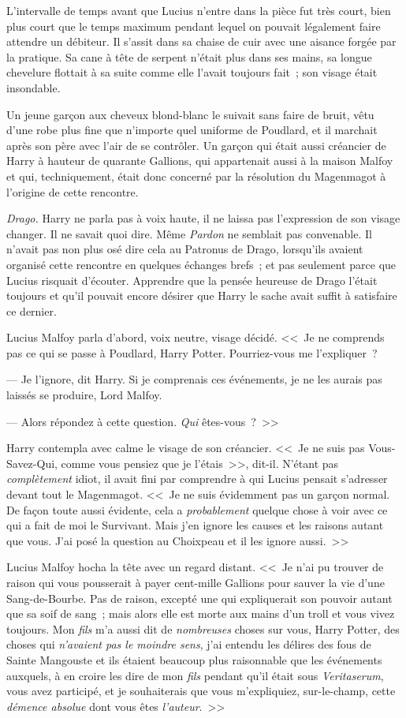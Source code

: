 L'intervalle de temps avant que Lucius n'entre dans la pièce fut très court, bien plus court que le temps maximum pendant lequel on pouvait légalement faire attendre un débiteur. Il s'assit dans sa chaise de cuir avec une aisance forgée par la pratique. Sa cane à tête de serpent n'était plus dans ses mains, sa longue chevelure flottait à sa suite comme elle l'avait toujours fait~; son visage était insondable.

Un jeune garçon aux cheveux blond-blanc le suivait sans faire de bruit, vêtu d'une robe plus fine que n'importe quel uniforme de Poudlard, et il marchait après son père avec l'air de se contrôler. Un garçon qui était aussi créancier de Harry à hauteur de quarante Gallions, qui appartenait aussi à la maison Malfoy et qui, techniquement, était donc concerné par la résolution du Magenmagot à l'origine de cette rencontre.

\emph{Drago.} Harry ne parla pas à voix haute, il ne laissa pas l'expression de son visage changer. Il ne savait quoi dire. Même \emph{Pardon} ne semblait pas convenable. Il n'avait pas non plus osé dire cela au Patronus de Drago, lorsqu'ils avaient organisé cette rencontre en quelques échanges brefs~; et pas seulement parce que Lucius risquait d'écouter. Apprendre que la pensée heureuse de Drago l'était toujours et qu'il pouvait encore désirer que Harry le sache avait suffit à satisfaire ce dernier.

Lucius Malfoy parla d'abord, voix neutre, visage décidé. <<~Je ne comprends pas ce qui se passe à Poudlard, Harry Potter. Pourriez-vous me l'expliquer~?

--- Je l'ignore, dit Harry. Si je comprenais ces événements, je ne les aurais pas laissés se produire, Lord Malfoy.

--- Alors répondez à cette question. \emph{Qui} êtes-vous~?~>>

Harry contempla avec calme le visage de son créancier. <<~Je ne suis pas Vous-Savez-Qui, comme vous pensiez que je l'étais~>>, dit-il. N'étant pas \emph{complètement} idiot, il avait fini par comprendre à qui Lucius pensait s'adresser devant tout le Magenmagot. <<~Je ne suis évidemment pas un garçon normal. De façon toute aussi évidente, cela a \emph{probablement} quelque chose à voir avec ce qui a fait de moi le Survivant. Mais j'en ignore les causes et les raisons autant que vous. J'ai posé la question au Choixpeau et il les ignore aussi.~>>

Lucius Malfoy hocha la tête avec un regard distant. <<~Je n'ai pu trouver de raison qui vous pousserait à payer cent-mille Gallions pour sauver la vie d'une Sang-de-Bourbe. Pas de raison, excepté une qui expliquerait son pouvoir autant que sa soif de sang~; mais alors elle est morte aux mains d'un troll et vous vivez toujours. Mon \emph{fils} m'a aussi dit de \emph{nombreuses} choses sur vous, Harry Potter, des choses qui \emph{n'avaient pas le moindre sens}, j'ai entendu les délires des fous de Sainte Mangouste et ils étaient beaucoup plus raisonnable que les événements auxquels, à en croire les dire de mon \emph{fils} pendant qu'il était sous \emph{Veritaserum}, vous avez participé, et je souhaiterais que vous m'expliquiez, sur-le-champ, cette \emph{démence absolue} dont vous êtes \emph{l'auteur}.~>>

